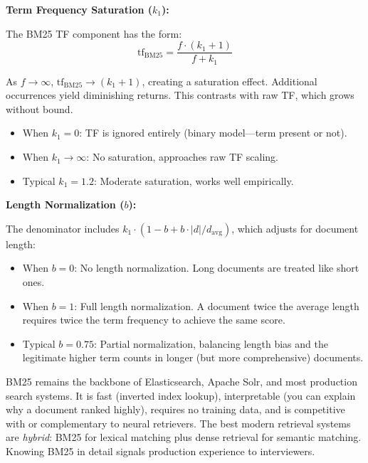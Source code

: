 \textbf{Term Frequency Saturation ($k_1$):}

The BM25 TF component has the form:
\begin{equation}
    \text{tf}_{\text{BM25}} = \frac{f \cdot (k_1 + 1)}{f + k_1}
    \label{eq:bm25_tf}
\end{equation}

As $f \to \infty$, $\text{tf}_{\text{BM25}} \to (k_1 + 1)$, creating a saturation
effect. Additional occurrences yield diminishing returns. This contrasts with raw TF,
which grows without bound.

\begin{itemize}
    \item When $k_1 = 0$: TF is ignored entirely (binary model---term present or not).
    \item When $k_1 \to \infty$: No saturation, approaches raw TF scaling.
    \item Typical $k_1 = 1.2$: Moderate saturation, works well empirically.
\end{itemize}

\textbf{Length Normalization ($b$):}

The denominator includes $k_1 \cdot (1 - b + b \cdot |d| / d_{\text{avg}})$, which
adjusts for document length:

\begin{itemize}
    \item When $b = 0$: No length normalization. Long documents are treated like short
    ones.
    \item When $b = 1$: Full length normalization. A document twice the average length
    requires twice the term frequency to achieve the same score.
    \item Typical $b = 0.75$: Partial normalization, balancing length bias and the
    legitimate higher term counts in longer (but more comprehensive) documents.
\end{itemize}

\begin{keyinsight}
BM25 remains the backbone of Elasticsearch, Apache Solr, and most production search
systems. It is fast (inverted index lookup), interpretable (you can explain why a document
ranked highly), requires no training data, and is competitive with or complementary to
neural retrievers. The best modern retrieval systems are \emph{hybrid}: BM25 for lexical
matching plus dense retrieval for semantic matching. Knowing BM25 in detail signals
production experience to interviewers.
\end{keyinsight}

